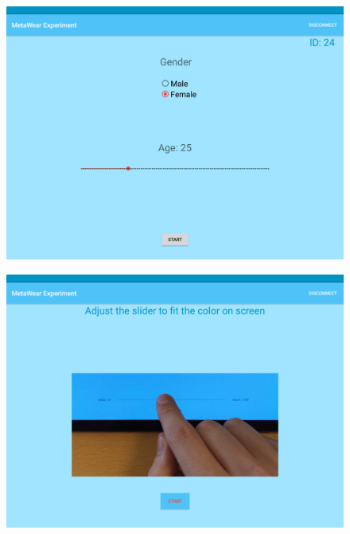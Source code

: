 \begin{figure}[h!]
\centering
\begin{minipage}{.55\textwidth}
  \centering
  \includegraphics[width=0.95\linewidth]{figures/tablet_screen5.png}
  \label{app_ex_start}
\end{minipage}%
\begin{minipage}{.55\textwidth}
  \centering
  \includegraphics[width=0.95\linewidth]{figures/tablet_screen6.png}
  \label{app_slider_explain}
\end{minipage}
\end{figure}

